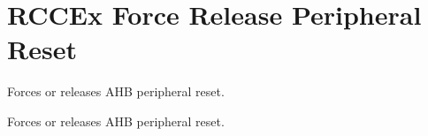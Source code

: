 \hypertarget{group___r_c_c_ex___force___release___peripheral___reset}{\section{R\-C\-C\-Ex Force Release Peripheral Reset}
\label{group___r_c_c_ex___force___release___peripheral___reset}
}


Forces or releases A\-H\-B peripheral reset.  


Forces or releases A\-H\-B peripheral reset. 